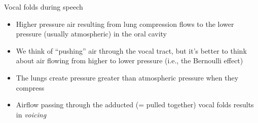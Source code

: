 \documentclass[professionalfonts]{beamer}
\begin{document}
\begin{frame}{Vocal folds during speech}
    \begin{itemize}
        \item Higher pressure air resulting from lung compression flows to the lower pressure (usually atmospheric) in the oral cavity
        \item We think of ``pushing'' air through the vocal tract, but it's better to think about air flowing from higher to lower pressure (i.e., the Bernoulli effect)
        \item The lungs create pressure greater than atmospheric pressure when they compress
        \item Airflow passing through the adducted (= pulled together) vocal folds results in \textit{voicing}
    \end{itemize}
\end{frame}
\end{document}
